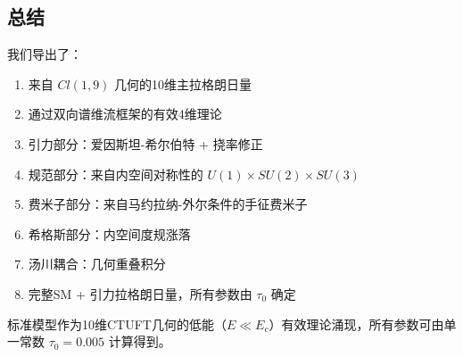 \subsection{总结}

我们导出了：
\begin{enumerate}
    \item 来自 $Cl(1,9)$ 几何的10维主拉格朗日量
    \item 通过双向谱维流框架的有效4维理论
    \item 引力部分：爱因斯坦-希尔伯特 + 挠率修正
    \item 规范部分：来自内空间对称性的 $U(1) \times SU(2) \times SU(3)$
    \item 费米子部分：来自马约拉纳-外尔条件的手征费米子
    \item 希格斯部分：内空间度规涨落
    \item 汤川耦合：几何重叠积分
    \item 完整SM + 引力拉格朗日量，所有参数由 $\tau_0$ 确定
\end{enumerate}

标准模型作为10维CTUFT几何的低能（$E \ll E_c$）有效理论涌现，所有参数可由单一常数 $\tau_0 = 0.005$ 计算得到。
